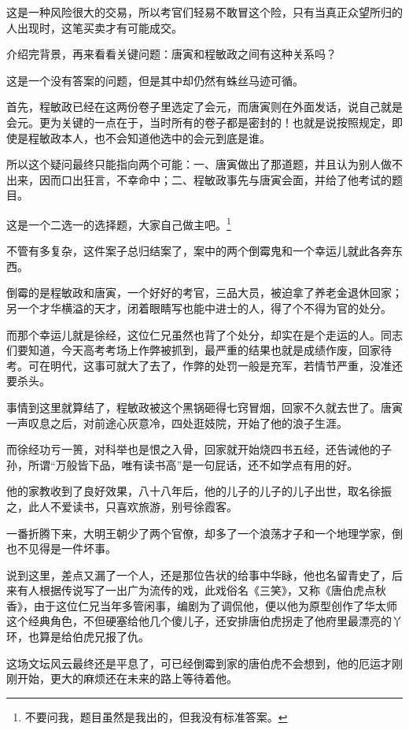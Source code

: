 \begin{multicols}{\theparacolNo}
		这是一种风险很大的交易，所以考官们轻易不敢冒这个险，只有当真正众望所归的人出现时，这笔买卖才有可能成交。

		介绍完背景，再来看看关键问题：唐寅和程敏政之间有这种关系吗？

		这是一个没有答案的问题，但是其中却仍然有蛛丝马迹可循。

		首先，程敏政已经在这两份卷子里选定了会元，而唐寅则在外面发话，说自己就是会元。更为关键的一点在于，当时所有的卷子都是密封的！也就是说按照规定，即使是程敏政本人，也不会知道他选中的会元到底是谁。

		所以这个疑问最终只能指向两个可能：一、唐寅做出了那道题，并且认为别人做不出来，因而口出狂言，不幸命中；二、程敏政事先与唐寅会面，并给了他考试的题目。

		这是一个二选一的选择题，大家自己做主吧。\footnote{不要问我，题目虽然是我出的，但我没有标准答案。}

		不管有多复杂，这件案子总归结案了，案中的两个倒霉鬼和一个幸运儿就此各奔东西。

		倒霉的是程敏政和唐寅，一个好好的考官，三品大员，被迫拿了养老金退休回家；另一个才华横溢的天才，闭着眼睛写也能中进士的人，得了个不得为官的处分。

		而那个幸运儿就是徐经，这位仁兄虽然也背了个处分，却实在是个走运的人。同志们要知道，今天高考考场上作弊被抓到，最严重的结果也就是成绩作废，回家待考。可在明代，这事可就大了去了，作弊的处罚一般是充军，若情节严重，没准还要杀头。

		事情到这里就算结了，程敏政被这个黑锅砸得七窍冒烟，回家不久就去世了。唐寅一声叹息之后，对前途心灰意冷，四处逛妓院，开始了他的浪子生涯。

		而徐经功亏一篑，对科举也是恨之入骨，回家就开始烧四书五经，还告诫他的子孙，所谓“万般皆下品，唯有读书高”是一句屁话，还不如学点有用的好。

		他的家教收到了良好效果，八十八年后，他的儿子的儿子的儿子出世，取名徐振之，此人不爱读书，只喜欢旅游，别号徐霞客。

		一番折腾下来，大明王朝少了两个官僚，却多了一个浪荡才子和一个地理学家，倒也不见得是一件坏事。

		说到这里，差点又漏了一个人，还是那位告状的给事中华眿，他也名留青史了，后来有人根据传说写了一出广为流传的戏，此戏俗名《三笑》，又称《唐伯虎点秋香》，由于这位仁兄当年多管闲事，编剧为了调侃他，便以他为原型创作了华太师这个经典角色，不但硬塞给他几个傻儿子，还安排唐伯虎拐走了他府里最漂亮的丫环，也算是给伯虎兄报了仇。

		这场文坛风云最终还是平息了，可已经倒霉到家的唐伯虎不会想到，他的厄运才刚刚开始，更大的麻烦还在未来的路上等待着他。


\end{multicols}
